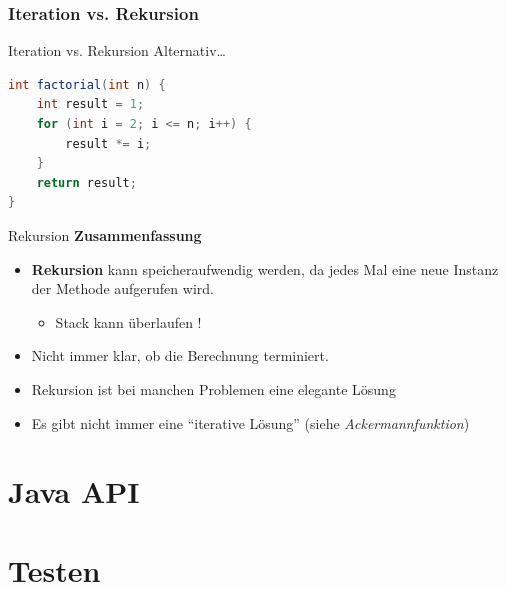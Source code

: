 \documentclass[18pt]{beamer}
\newcommand{\quotes}[1]{``#1''}
\begin{document}
\subsubsection{Iteration vs. Rekursion}

\begin{frame}[fragile]{Iteration vs. Rekursion}
    Alternativ\dots
    \begin{exampleblock}{}
        \begin{lstlisting}[language=Java,basicstyle=\scriptsize]
int factorial(int n) {
    int result = 1;
    for (int i = 2; i <= n; i++) {
        result *= i;
    }
    return result;
}
        \end{lstlisting}

    \end{exampleblock}
\end{frame}

\begin{frame}{Rekursion}
    \textbf{Zusammenfassung}
    \begin{itemize}
        \item \textbf{Rekursion} kann speicheraufwendig werden, da jedes Mal eine neue Instanz der Methode aufgerufen wird.
        \begin{itemize}
            \item Stack kann überlaufen !
        \end{itemize}
        \item Nicht immer klar, ob die Berechnung terminiert.
        \item Rekursion ist bei manchen Problemen eine elegante Lösung
        \item Es gibt nicht immer eine \quotes{iterative Lösung} (siehe \textit{Ackermannfunktion})
    \end{itemize}
\end{frame}


\section{Java API}



\section{Testen}
\end{document}
